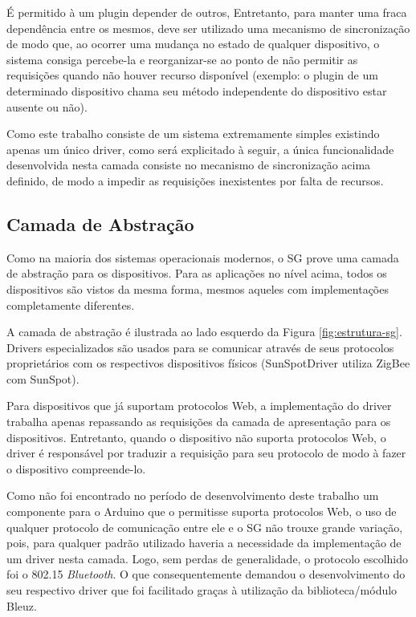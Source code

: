 \documentclass[12pt,a4paper,oneside]{report}
\begin{document}
É permitido à um plugin depender de outros, Entretanto, para manter uma fraca dependência entre os mesmos, deve ser utilizado uma mecanismo de sincronização de modo que, ao ocorrer uma mudança no estado de qualquer dispositivo, o sistema consiga percebe-la e reorganizar-se ao ponto de não permitir as requisições quando não houver recurso disponível (exemplo: o plugin de um determinado dispositivo chama seu método independente do dispositivo estar ausente ou não).

Como este trabalho consiste de um sistema extremamente simples existindo apenas um único driver, como será explicitado à seguir, a única funcionalidade desenvolvida nesta camada consiste no mecanismo de sincronização acima definido, de modo a impedir as requisições inexistentes por falta de recursos.

\subsection{Camada de Abstração}

Como na maioria dos sistemas operacionais modernos, o SG prove uma camada de abstração para os dispositivos. Para as aplicações no nível acima, todos os dispositivos são vistos da mesma forma, mesmos aqueles com implementações completamente diferentes.

A camada de abstração é ilustrada ao lado esquerdo da Figura \ref{fig:estrutura-sg}. Drivers especializados são usados para se comunicar através de seus protocolos proprietários com os respectivos dispositivos físicos (SunSpotDriver utiliza ZigBee com SunSpot).

Para dispositivos que já suportam protocolos Web, a implementação do driver trabalha apenas repassando as requisições da camada de apresentação para os dispositivos. Entretanto, quando o dispositivo não suporta protocolos Web, o driver é responsável por traduzir a requisição para seu protocolo de modo à fazer o dispositivo compreende-lo.

Como não foi encontrado no período de desenvolvimento deste trabalho um componente para o Arduino que o permitisse suporta protocolos Web, o uso de qualquer protocolo de comunicação entre ele e o SG não trouxe grande variação, pois, para qualquer padrão utilizado haveria a necessidade da implementação de um driver nesta camada. Logo, sem perdas de generalidade, o protocolo escolhido foi o 802.15 \emph{Bluetooth}. O que consequentemente demandou o desenvolvimento do seu respectivo driver que foi facilitado graças à utilização da biblioteca/módulo Bleuz.
\end{document}
